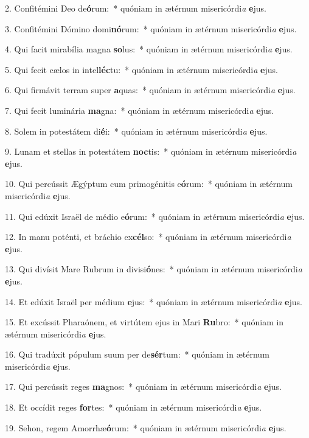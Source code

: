2. Confitémini Deo de\textbf{ó}rum:~*  quóniam in ætérnum misericórdi\textit{a} \textbf{e}jus.\

3. Confitémini Dómino domi\textbf{nó}rum:~*  quóniam in ætérnum misericórdi\textit{a} \textbf{e}jus.\

4. Qui facit mirabília magna \textbf{so}lus:~*  quóniam in ætérnum misericórdi\textit{a} \textbf{e}jus.\

5. Qui fecit cælos in intel\textbf{léc}tu:~*  quóniam in ætérnum misericórdi\textit{a} \textbf{e}jus.\

6. Qui firmávit terram super \textbf{a}quas:~*  quóniam in ætérnum misericórdi\textit{a} \textbf{e}jus.\

7. Qui fecit luminária \textbf{ma}gna:~*  quóniam in ætérnum misericórdi\textit{a} \textbf{e}jus.\

8. Solem in potestátem di\textbf{é}i:~*  quóniam in ætérnum misericórdi\textit{a} \textbf{e}jus.\

9. Lunam et stellas in potestátem \textbf{noc}tis:~*  quóniam in ætérnum misericórdi\textit{a} \textbf{e}jus.\

10. Qui percússit Ægýptum cum primogénitis e\textbf{ó}rum:~*  quóniam in ætérnum misericórdi\textit{a} \textbf{e}jus.\

11. Qui edúxit Israël de médio e\textbf{ó}rum:~*  quóniam in ætérnum misericórdi\textit{a} \textbf{e}jus.\

12. In manu poténti, et bráchio ex\textbf{cél}so:~*  quóniam in ætérnum misericórdi\textit{a} \textbf{e}jus.\

13. Qui divísit Mare Rubrum in divisi\textbf{ó}nes:~*  quóniam in ætérnum misericórdi\textit{a} \textbf{e}jus.\

14. Et edúxit Israël per médium \textbf{e}jus:~*  quóniam in ætérnum misericórdi\textit{a} \textbf{e}jus.\

15. Et excússit Pharaónem, et virtútem ejus in Mari \textbf{Ru}bro:~*  quóniam in ætérnum misericórdi\textit{a} \textbf{e}jus.\

16. Qui tradúxit pópulum suum per de\textbf{sér}tum:~*  quóniam in ætérnum misericórdi\textit{a} \textbf{e}jus.\

17. Qui percússit reges \textbf{ma}gnos:~*  quóniam in ætérnum misericórdi\textit{a} \textbf{e}jus.\

18. Et occídit reges \textbf{for}tes:~*  quóniam in ætérnum misericórdi\textit{a} \textbf{e}jus.\

19. Sehon, regem Amorrhæ\textbf{ó}rum:~*  quóniam in ætérnum misericórdi\textit{a} \textbf{e}jus.\

